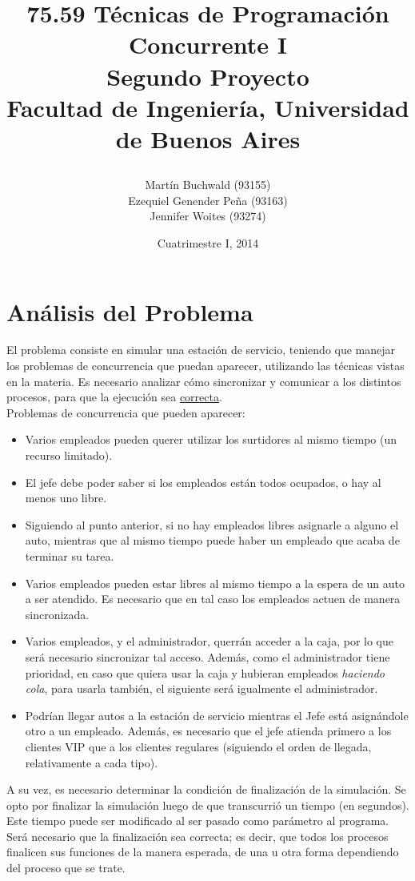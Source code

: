 \documentclass[a4paper,12pt]{article}
\author{Martín Buchwald (93155) \\ Ezequiel Genender Peña (93163) \\ Jennifer Woites (93274)}
\title{75.59 Técnicas de Programación Concurrente I\\
	\textbf{Segundo Proyecto}\\
	Facultad de Ingeniería, Universidad de Buenos Aires
	\date{Cuatrimestre I, 2014}
}
\begin{document}
\maketitle
\thispagestyle{empty}
\newpage
\tableofcontents
\newpage

\section{Análisis del Problema}
El problema consiste en simular una estación de servicio, teniendo que manejar los problemas de concurrencia que puedan aparecer, utilizando las técnicas vistas en la materia. Es necesario analizar cómo sincronizar y comunicar a los distintos procesos, para que la ejecución sea \underline{correcta}.\\
Problemas de concurrencia que pueden aparecer:

\begin{itemize}
	\item Varios empleados pueden querer utilizar los surtidores al mismo tiempo (un recurso
	 limitado).
	\item El jefe debe poder saber si los empleados están todos ocupados, o hay al menos uno
	 libre.
	\item Siguiendo al punto anterior, si no hay empleados libres	 asignarle a alguno el auto,
	 mientras que al mismo tiempo puede haber un empleado que acaba de terminar su tarea.
	\item Varios empleados pueden estar libres al mismo tiempo a la espera de un auto a ser
	 atendido. Es necesario que en tal caso los empleados actuen de manera sincronizada.
	\item Varios empleados, y el administrador, querrán acceder a la caja, por lo que será
	necesario sincronizar tal acceso. Además, como el administrador tiene prioridad, en caso que
	quiera usar la caja y hubieran empleados \textit{haciendo cola}, para usarla también, el siguiente
	será igualmente el administrador.
	\item Podrían llegar autos a la estación de servicio mientras el Jefe está asignándole
	otro a un empleado. Además, es necesario que el jefe atienda primero a los clientes VIP que
	a los clientes regulares (siguiendo el orden de llegada, relativamente a cada tipo).
\end{itemize}


A su vez, es necesario determinar la condición de finalización de la simulación. Se opto por finalizar la simulación luego de que transcurrió un tiempo (en segundos). Este tiempo puede ser modificado al ser pasado como parámetro al programa.
Será necesario que la finalización sea correcta; es decir, que todos los procesos finalicen sus funciones de la manera esperada, de una u otra forma dependiendo del proceso que se trate.
\end{document}
